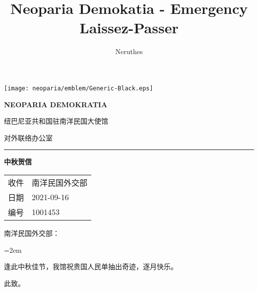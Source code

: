 \documentclass[a4paper,11pt]{article}
\title{Neoparia Demokatia - Emergency Laissez-Passer}
\author{Neruthes}
\date{}
\begin{document}
    \pagestyle{empty}
    \raggedright
    \raggedbottom



    {\hfill{\texttt{[image: neoparia/emblem/Generic-Black.eps]}}\hfill}
    
    \sffamily\bfseries\large
    {\hfill{NEOPARIA DEMOKRATIA}\hfill}


    {\hfill{纽巴尼亚共和国驻南洋民国大使馆}\hfill}

    {\hfill{对外联络办公室}\hfill}

    \vspace{16pt}
    \hrule
    \vspace{16pt}


    {\hfill{\huge\bfseries{中秋贺信}}\hfill}

    \vspace{8pt}
    

    \tabcolsep=0pt
    \ttfamily\mdseries\normalsize
    \begin{tabu} {ll}
        {收件} & {\hspace{6pt}南洋民国外交部} \\
        {日期} & {\hspace{6pt}2021-09-16} \\
        {编号} & {\hspace{6pt}1001453} \\
    \end{tabu}

    \vspace{8pt}
    \rmfamily\normalsize\mdseries

    南洋民国外交部：\vspace{8pt}

    \parindent=2em

    逢此中秋佳节，我馆祝贵国人民单抽出奇迹，逐月快乐。
    
    \parindent=0pt

    \vspace{8pt}此致。
\end{document}
